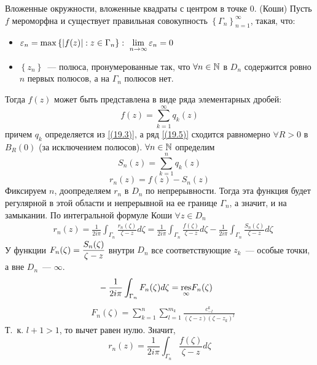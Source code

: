 \example
Вложенные окружности, вложенные квадраты с центром в точке $0$.
\theorem (Коши)
Пусть $f$ мероморфна и существует правильная совокупность $\left\{ \Gamma_n
\right\}_{n=1}^\infty$, такая, что:
\begin{itemize}
    \item $\varepsilon_n = \max\left\{ \left| f(z) \right|: z \in \Gamma_n
    \right\}: \ \displaystyle \lim_{n \to \infty}\varepsilon_n = 0$
    \item $\left\{ z_n \right\}$~--- полюса, пронумерованные так, что $\forall n
    \in \mathbb{N}$ в $D_n$ содержится ровно $n$ первых полюсов, а на $\Gamma_n$ полюсов
    нет.
\end{itemize}
Тогда $f(z)$ может быть представлена в виде ряда элементарных дробей:
\begin{equation}\label{(19.5)}
    f(z) = \sum_{k=1}^\infty q_k(z)
\end{equation}
причем $q_k$ определяется из \eqref{(19.3)}, а ряд \eqref{(19.5)} сходится
равномерно $\forall R > 0$ в $B_R(0)$ (за исключением полюсов).
\pr
$\forall n \in \mathbb{N}$ определим
\begin{equation}\label{(19.6)}
    S_n(z) = \sum_{k=1}^n q_k(z)
\end{equation}
\begin{equation}\label{(19.7)}
    r_n(z) = f(z) - S_n(z)
\end{equation}
Фиксируем $n$, доопределяем $r_n$ в $D_n$ по непрерывности. Тогда эта функция
будет регулярной в этой области и непрерывной на ее границе $\Gamma_n$, а
значит, и на замыкании. По интегральной формуле Коши $\forall z \in D_n$
\begin{align*}
  & r_n(z) = \frac{1}{2 i \pi}\int_{\Gamma_n}\frac{r_n(\zeta)}{\zeta - z}d\zeta = \frac{1}{2 i \pi}\int_{\Gamma_n}\frac{f(\zeta)}{\zeta - z}d\zeta - \frac{1}{2 i \pi}\int_{\Gamma_n}\frac{S_n(\zeta)}{\zeta - z}d\zeta
\end{align*}
У функции $F_n(\zeta) = \displaystyle \frac{S_n(\zeta)}{\zeta - z}$ внутри $D_n$ все
соответствующие $z_k$~--- особые точки, а вне $D_n$~--- $\infty$.
\begin{align*}
  & -\frac{1}{2 i \pi}\int_{\Gamma_n}F_n(\zeta) d\zeta = \underset{\infty}{\mathrm{res}}F_n(\zeta)
\end{align*}
\begin{align*}
  & F_n(\zeta) = \sum_{k=1}^n\sum_{l=1}^{m_k}\frac{c_{-l}^k}{(\zeta - z)(\zeta - z_k)^{l}}
\end{align*}
Т.~к. $l+1 > 1$, то вычет равен нулю. Значит,
\begin{equation}\label{(19.8)}
    r_n(z) = \frac{1}{2 i \pi}\int_{\Gamma_n}\frac{f(\zeta)}{\zeta - z}d\zeta
\end{equation}
